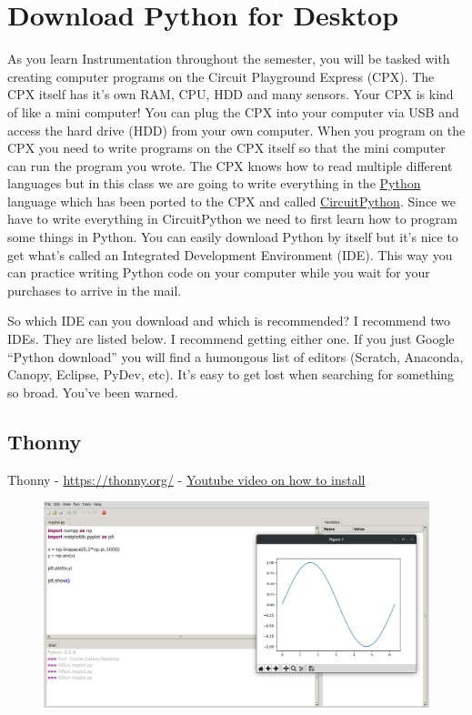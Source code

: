 \newpage 

\section{Download Python for Desktop}

As you learn Instrumentation throughout the semester, you will be
tasked with creating computer programs on the Circuit Playground
Express (CPX). The CPX itself has it’s own RAM, CPU, HDD and many
sensors. Your CPX is kind of like a mini computer! You can plug the
CPX into your computer via USB and access the hard drive (HDD) from
your own computer. When you program on the CPX you need to write
programs on the CPX itself so that the mini computer can run the
program you wrote. The CPX knows how to read multiple different
languages but in this class we are going to write everything in the
\href{https://www.python.org/}{Python} language which has been ported
to the CPX and called
\href{https://circuitpython.org/}{CircuitPython}. Since we have to
write everything in CircuitPython we 
need to first learn how to program some things in Python. You can
easily download Python by itself but it’s nice to get what’s called an
Integrated Development Environment (IDE). This way you can practice
writing Python code on your computer while you wait for your purchases
to arrive in the mail. 

So which IDE can you download and which is recommended? I recommend
two IDEs. They are listed below. I recommend getting either one. If
you just Google “Python download” you will find a humongous list of
editors (Scratch, Anaconda, Canopy, Eclipse, PyDev, etc). It’s easy to
get lost when searching for something so broad. You’ve been warned.

\subsection{Thonny}

Thonny - \url{https://thonny.org/} -
\href{https://www.youtube.com/watch?v=qaxukpYRqfA&list=PL_D7_GvGz-v1RsDs_OdNW65qRjEjmpfQx&index=14}{Youtube
  video on how to install}

\begin{figure}[H]
  \begin{center}
    \includegraphics[width=\textwidth]{Figures/Thonny.png}
  \end{center}
\end{figure}

